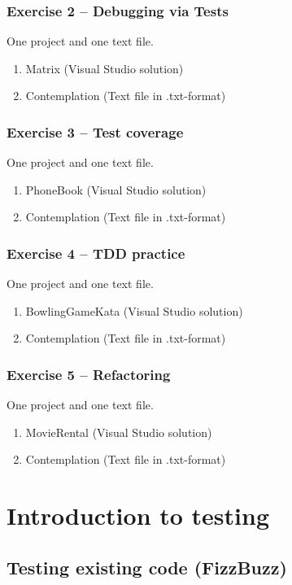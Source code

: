 \documentclass{article}
\begin{document}
\subsubsection*{Exercise 2 -- Debugging via Tests}
One project and one text file.
\begin{enumerate}
  \item Matrix (Visual Studio solution)
  \item Contemplation (Text file in .txt-format)
\end{enumerate}

\subsubsection*{Exercise 3 -- Test coverage}
One project and one text file.
\begin{enumerate}
  \item PhoneBook (Visual Studio solution)
  \item Contemplation (Text file in .txt-format)
\end{enumerate}

\subsubsection*{Exercise 4 -- TDD practice}
One project and one text file.
\begin{enumerate}
  \item BowlingGameKata (Visual Studio solution)
  \item Contemplation (Text file in .txt-format)
\end{enumerate}

\subsubsection*{Exercise 5 -- Refactoring}
One project and one text file.
\begin{enumerate}
  \item MovieRental (Visual Studio solution)
  \item Contemplation (Text file in .txt-format)
\end{enumerate}




\pagebreak{}
  \section{Introduction to testing}
  \subsection{ Testing existing code (FizzBuzz) }
\end{document}
